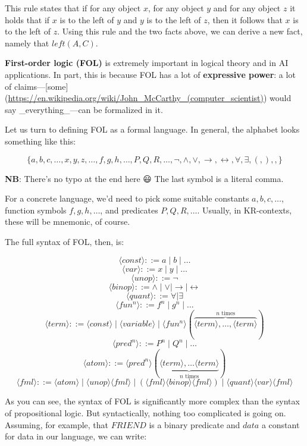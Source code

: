 \documentclass[11pt]{article}
\begin{document}
This rule states that if for any object \(x\), for any object \(y\) and for any object \(z\) it holds that if \(x\) is to the left of \(y\) and \(y\) is to the left of \(z\), then it follows that \(x\) is to the left of \(z\). Using this rule and the two facts above, we can derive a new fact, namely that \(left(A,C)\).

\textbf{\textbf{First-order logic (FOL)}} is extremely important in logical theory and in AI
applications. In part, this is because FOL has a lot of \textbf{\textbf{expressive power}}: a
lot of
claims—[some](\url{https://en.wikipedia.org/wiki/John\_McCarthy\_(computer\_scientist)})
would say \_everything\_—can be formalized in it. 

Let us turn to defining FOL as a formal language. In general, the alphabet looks something like this:

$$\{a,b,c,\dots,
x,y,z,\dots,f,g,h,\dots,P,Q,R,\dots,\neg,\land,\lor,\rightarrow,\leftrightarrow,\forall,\exists,(,),,\}$$

\textbf{\textbf{NB}}: There's no typo at the end here 😃 The last symbol is a literal comma.

For a concrete language, we'd need to pick some suitable constants
\(a,b,c,\dots\), function symbols \(f,g,h,\dots\), and predicates \(P,Q,R,\dots\).
Usually, in KR-contexts, these will be mnemonic, of course. 

The full syntax of FOL, then, is:

$$\langle const\rangle ::= a \mid b\mid \dots $$
$$\langle var\rangle ::= x \mid y\mid \dots $$
$$\langle unop\rangle ::= \neg$$
$$\langle binop\rangle ::= \land\mid\lor\mid\rightarrow\mid\leftrightarrow$$
$$\langle quant\rangle ::= \forall\mid\exists$$
$$\langle fu n^n\rangle ::= f^n\mid g^n\mid \dots $$
$$\langle term\rangle::= \langle const\rangle\mid\langle variable\rangle\mid
\langle fun^n\rangle(\overbrace{\langle term\rangle,\dots,\langle term\rangle}^{n\text{ times}})$$
$$\langle pred^n\rangle ::= P^n\mid Q^n\mid \dots $$
$$\langle atom\rangle::= \langle pred^n\rangle(\underbrace{\langle term\rangle,\dots\langle term\rangle}_{n\text{ times}})$$
$$\langle fml\rangle::=\langle atom\rangle\mid\langle unop\rangle\langle fml\rangle\mid
(\langle fml\rangle\langle binop\rangle \langle fml\rangle)\mid \langle quant\rangle \langle
var\rangle\langle fml\rangle$$

As you can see, the syntax of FOL is significantly more complex than the syntax
of propositional logic. But syntactically, nothing too complicated is going on.
Assuming, for example, that \(FRIEND\) is a binary predicate and \(data\) a constant
for data in our language, we can write:
\end{document}
